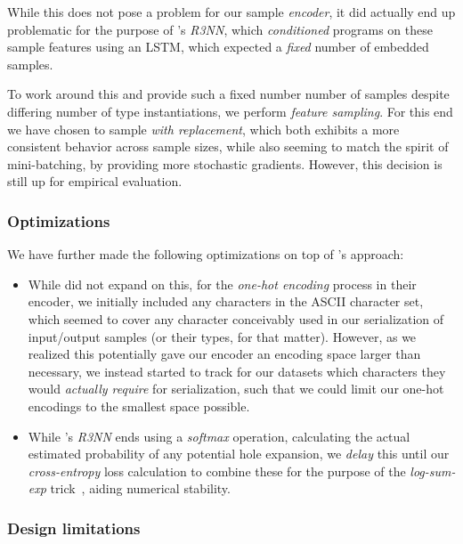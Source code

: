\documentclass{article}
\begin{document}
    While this does not pose a problem for our sample \emph{encoder},
    it did actually end up problematic for the purpose of \citet{nsps}'s \emph{R3NN},
    which \emph{conditioned} programs on these sample features using an LSTM,
    which expected a \emph{fixed} number of embedded samples.

    To work around this and provide such a fixed number number of samples despite differing number of type instantiations,
    we perform \emph{feature sampling}.
    For this end we have chosen to sample \emph{with replacement},
    which both exhibits a more consistent behavior across sample sizes,
    while also seeming to match the spirit of mini-batching,
    by providing more stochastic gradients.
    However, this decision is still up for empirical evaluation.

\subsubsection{Optimizations}

We have further made the following optimizations on top of \citet{nsps}'s approach:
\begin{itemize}
    \item While \citet{nsps} did not expand on this,
    for the \emph{one-hot encoding} process in their encoder,
    we initially included any characters in the ASCII character set,
    which seemed to cover any character conceivably used in our serialization of input/output samples (or their types, for that matter).
    However, as we realized this potentially gave our encoder an encoding space larger than necessary,
    we instead started to track for our datasets which characters they would \emph{actually require} for serialization,
    such that we could limit our one-hot encodings to the smallest space possible.
    \item While \citet{nsps}'s \emph{R3NN} ends using a \emph{softmax} operation,
    calculating the actual estimated probability of any potential hole expansion,
    we \emph{delay} this until our \emph{cross-entropy} loss calculation to combine these for the purpose of the \emph{log-sum-exp} trick~\citep{eisele2016log},
    aiding numerical stability.
\end{itemize}

\subsubsection{Design limitations}
\end{document}
